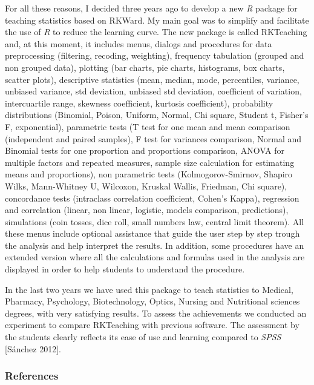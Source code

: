 \documentclass[11pt, a4paper]{article}
\newcommand{\pkg}[1]{{\normalfont\fontseries{b}\selectfont #1}}
\let\proglang=\textit
\begin{document}
For all these reasons, I decided three years ago to develop a new \proglang{R} package for teaching statistics based on
\pkg{RKWard}.
My main goal was to simplify and facilitate the use of \proglang{R} to reduce the learning curve.
The new package is called \pkg{RKTeaching} and, at this moment, it includes menus, dialogs and procedures for data
preprocessing (filtering, recoding, weighting), frequency tabulation (grouped and non grouped data), plotting (bar
charts, pie charts, histograms, box charts, scatter plots), descriptive statistics (mean, median, mode, percentiles,
variance, unbiased variance, std deviation, unbiased std deviation, coefficient of variation, intercuartile range,
skewness coefficient, kurtosis coefficient), probability distributions (Binomial, Poison, Uniform, Normal, Chi square,
Student t, Fisher's F, exponential), parametric tests (T test for one mean and mean comparison (independent and paired
samples), F test for variances comparison, Normal and Binomial tests for one proportion and proportions comparison,
ANOVA for multiple factors and repeated measures, sample size calculation for estimating means and proportions), non
parametric tests (Kolmogorov-Smirnov, Shapiro Wilks, Mann-Whitney U, Wilcoxon, Kruskal Wallis, Friedman, Chi square),
concordance tests (intraclass correlation coefficient, Cohen's Kappa), regression and correlation (linear, non linear,
logistic, models comparison, predictions), simulations (coin tosses, dice roll, small numbers law, central limit
theorem).
All these menus include optional assistance that guide the user step by step trough the analysis and help interpret the
results. In addition, some procedures have an extended version where all the calculations and formulas used in the
analysis are displayed in order to help students  to understand the procedure.

In the last two years we have used this package to teach statistics to Medical, Pharmacy, Psychology, Biotechnology,
Optics, Nursing and Nutritional sciences degrees, with very satisfying results. To assess the achievements we conducted
an experiment to compare \pkg{RKTeaching} with previous software. The assessment by the students clearly reflects its ease of
use and learning compared to \proglang{SPSS} [S\'anchez 2012].




\subsubsection*{References}
\end{document}
